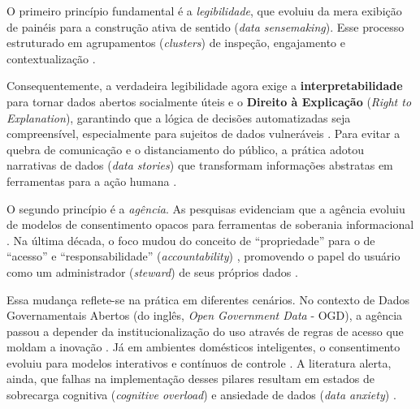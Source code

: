 \documentclass[
	12pt,				%
	oneside,			%
	a4paper,			%
	english,			%
	brazil				%
	]{abntex2ppgsi}
\begin{document}
    O primeiro princípio fundamental é a \emph{legibilidade}, que evoluiu da mera exibição de painéis para a construção ativa de sentido (\textit{data sensemaking}). Esse processo estruturado em agrupamentos (\textit{clusters}) de inspeção, engajamento e contextualização \cite{casado2022sonification, capeleti2023heuristic, Yuan20243615, Sailaja2021Designing, Xiao2021, Koesten2021, Haghighati2020, Koesten2020, Hornung2015}.
    
    Consequentemente, a verdadeira legibilidade agora exige a \textbf{interpretabilidade} para tornar dados abertos socialmente úteis \cite{barcellos2022towards} e o \textbf{Direito à Explicação} (\textit{Right to Explanation}), garantindo que a lógica de decisões automatizadas seja compreensível, especialmente para sujeitos de dados vulneráveis \cite{malgieri2020vulnerable, malgieri2019automated, Victorelli2020Human, DeAlmeida2019}. Para evitar a quebra de comunicação e o distanciamento do público, a prática adotou narrativas de dados (\textit{data stories}) que transformam informações abstratas em ferramentas para a ação humana \cite{ferreira2024connecting}.
    
    O segundo princípio é a \emph{agência}. As pesquisas evidenciam que a agência evoluiu de modelos de consentimento opacos para ferramentas de soberania informacional \cite{coleti2024human, Meechan2023, Elliot2023, Hutton2017, Mashhadi2014}. Na última década, o foco mudou do conceito de ``propriedade'' para o de ``acesso'' e ``responsabilidade'' (\textit{accountability}) \cite{janecek2018ownership}, promovendo o papel do usuário como um administrador (\textit{steward}) de seus próprios dados \cite{angelopoulos2021stewardship}.
    
    Essa mudança reflete-se na prática em diferentes cenários. No contexto de Dados Governamentais Abertos (do inglês, \textit{Open Government Data} - OGD), a agência passou a depender da institucionalização do uso através de regras de acesso que moldam a inovação \cite{mu2024institutional}. Já em ambientes domésticos inteligentes, o consentimento evoluiu para modelos interativos e contínuos de controle \cite{chalhoub2024useful}. A literatura alerta, ainda, que falhas na implementação desses pilares resultam em estados de sobrecarga cognitiva (\textit{cognitive overload}) e ansiedade de dados (\textit{data anxiety}) \cite{cezar2023cognitive}.
    
\end{document}
